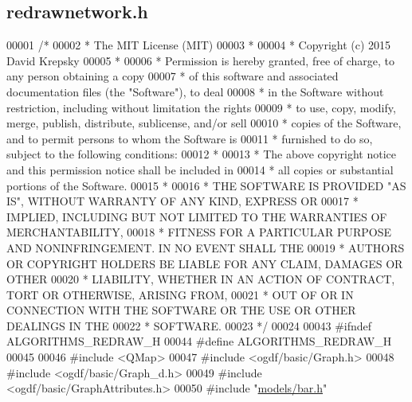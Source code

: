 \hypertarget{redrawnetwork_8h_source}{}\subsection{redrawnetwork.\+h}
\label{redrawnetwork_8h_source}

\begin{DoxyCode}
00001 \textcolor{comment}{/*}
00002 \textcolor{comment}{ * The MIT License (MIT)}
00003 \textcolor{comment}{ *}
00004 \textcolor{comment}{ * Copyright (c) 2015 David Krepsky}
00005 \textcolor{comment}{ *}
00006 \textcolor{comment}{ * Permission is hereby granted, free of charge, to any person obtaining a copy}
00007 \textcolor{comment}{ * of this software and associated documentation files (the "Software"), to deal}
00008 \textcolor{comment}{ * in the Software without restriction, including without limitation the rights}
00009 \textcolor{comment}{ * to use, copy, modify, merge, publish, distribute, sublicense, and/or sell}
00010 \textcolor{comment}{ * copies of the Software, and to permit persons to whom the Software is}
00011 \textcolor{comment}{ * furnished to do so, subject to the following conditions:}
00012 \textcolor{comment}{ *}
00013 \textcolor{comment}{ * The above copyright notice and this permission notice shall be included in}
00014 \textcolor{comment}{ * all copies or substantial portions of the Software.}
00015 \textcolor{comment}{ *}
00016 \textcolor{comment}{ * THE SOFTWARE IS PROVIDED "AS IS", WITHOUT WARRANTY OF ANY KIND, EXPRESS OR}
00017 \textcolor{comment}{ * IMPLIED, INCLUDING BUT NOT LIMITED TO THE WARRANTIES OF MERCHANTABILITY,}
00018 \textcolor{comment}{ * FITNESS FOR A PARTICULAR PURPOSE AND NONINFRINGEMENT. IN NO EVENT SHALL THE}
00019 \textcolor{comment}{ * AUTHORS OR COPYRIGHT HOLDERS BE LIABLE FOR ANY CLAIM, DAMAGES OR OTHER}
00020 \textcolor{comment}{ * LIABILITY, WHETHER IN AN ACTION OF CONTRACT, TORT OR OTHERWISE, ARISING FROM,}
00021 \textcolor{comment}{ * OUT OF OR IN CONNECTION WITH THE SOFTWARE OR THE USE OR OTHER DEALINGS IN THE}
00022 \textcolor{comment}{ * SOFTWARE.}
00023 \textcolor{comment}{ */}
00024 
00043 \textcolor{preprocessor}{#ifndef ALGORITHMS\_REDRAW\_H}
00044 \textcolor{preprocessor}{#define ALGORITHMS\_REDRAW\_H}
00045 
00046 \textcolor{preprocessor}{#include <QMap>}
00047 \textcolor{preprocessor}{#include <ogdf/basic/Graph.h>}
00048 \textcolor{preprocessor}{#include <ogdf/basic/Graph\_d.h>}
00049 \textcolor{preprocessor}{#include <ogdf/basic/GraphAttributes.h>}
00050 \textcolor{preprocessor}{#include "\hyperlink{bar_8h}{models/bar.h}"}

\end{DoxyCode}

